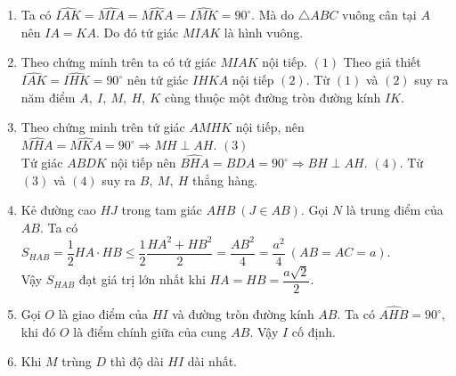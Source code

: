 \begin{bt}
{\begin{center}
\begin{tikzpicture}[line join = round, line cap = round,>=stealth,font=\footnotesize,scale=1]
			\end{tikzpicture}
		\end{center}
		\begin{enumerate}
			\item Ta có $\widehat{IAK}=\widehat{MIA}=\widehat{MKA}=\widehat{IMK}=90^\circ$. Mà do $\triangle ABC$ vuông cân tại $A$ nên $IA=KA$. Do đó tứ giác $MIAK$ là hình vuông.
			\item Theo chứng minh trên ta có tứ giác $MIAK$ nội tiếp. $(1)$  Theo giả thiết $\widehat{IAK}=\widehat{IHK}=90^\circ$ nên tứ giác $IHKA$ nội tiếp $(2)$. Từ $(1)$ và $(2)$ suy ra năm điểm $A,\ I,\ M,\ H,\ K$ cùng thuộc một đường tròn đường kính $IK$.
			\item Theo chứng minh trên tứ giác $AMHK$ nội tiếp, nên $\widehat{MHA}=\widehat{MKA}=90^\circ\Rightarrow MH\perp AH$. $(3)$\\
			Tứ giác $ABDK$ nội tiếp nên $\widehat{BHA}=\widehat{BDA}=90^\circ\Rightarrow BH\perp AH$. $(4)$. Từ $(3)$ và $(4)$ suy ra $B,\ M,\ H$ thẳng hàng.
			\item Kẻ đường cao $HJ$ trong tam giác $AHB\ (J\in AB)$. Gọi $N$ là trung điểm của $AB$. Ta có $S_{HAB}=\dfrac{1}{2}HA\cdot HB\le\dfrac{1}{2}\dfrac{HA^2+HB^2}{2}=\dfrac{AB^2}{4}=\dfrac{a^2}{4}\ (AB=AC=a).$\\
			Vậy $S_{HAB}$ đạt giá trị lớn nhất khi $HA=HB=\dfrac{a\sqrt{2}}{2}$.
			\item Gọi $O$ là giao điểm của $HI$ và đường tròn đường kính $AB$. Ta có $\widehat{AHB}=90^\circ$, khi đó $O$ là điểm chính giữa của cung $AB$. Vậy $I$ cố định.
			\item Khi $M$ trùng $D$ thì độ dài $HI$ dài nhất.
		\end{enumerate}
	}
\end{bt}

